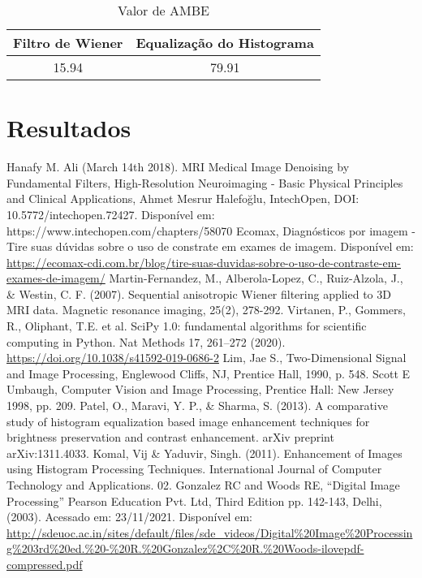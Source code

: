 \documentclass[conference]{IEEEtran}
\begin{document}
\begin{table}[H]
\renewcommand{\arraystretch}{1.3}
\caption{Valor de AMBE}
\label{table_example}
\centering
\begin{tabular}{c||c}
\hline
\bfseries Filtro de Wiener &
\bfseries Equalização do Histograma \\
\hline\hline
15.94 & 79.91 \\
\hline
\end{tabular}
\end{table}

\section{Resultados}

\begin{thebibliography}{00}
 Hanafy M. Ali (March 14th 2018). MRI Medical Image Denoising by Fundamental Filters, High-Resolution Neuroimaging - Basic Physical Principles and Clinical Applications, Ahmet Mesrur Halefoğlu, IntechOpen, DOI: 10.5772/intechopen.72427. Disponível em: https://www.intechopen.com/chapters/58070
 Ecomax, Diagnósticos por imagem - Tire suas dúvidas sobre o uso de constrate em exames de imagem. Disponível em: \url{https://ecomax-cdi.com.br/blog/tire-suas-duvidas-sobre-o-uso-de-contraste-em-exames-de-imagem/}
 Martin-Fernandez, M., Alberola-Lopez, C., Ruiz-Alzola, J., \& Westin, C. F. (2007). Sequential anisotropic Wiener filtering applied to 3D MRI data. Magnetic resonance imaging, 25(2), 278-292.
 Virtanen, P., Gommers, R., Oliphant, T.E. et al. SciPy 1.0: fundamental algorithms for scientific computing in Python. Nat Methods 17, 261–272 (2020). \url{https://doi.org/10.1038/s41592-019-0686-2}
 Lim, Jae S., Two-Dimensional Signal and Image Processing, Englewood Cliffs, NJ, Prentice Hall, 1990, p. 548.
 Scott E Umbaugh, Computer Vision and Image Processing, Prentice Hall: New Jersey 1998, pp. 209.
 Patel, O., Maravi, Y. P., \& Sharma, S. (2013). A comparative study of histogram equalization based image enhancement techniques for brightness preservation and contrast enhancement. arXiv preprint arXiv:1311.4033.
 Komal, Vij \& Yaduvir, Singh. (2011). Enhancement of Images using Histogram Processing Techniques. International Journal of Computer Technology and Applications. 02.
 Gonzalez RC and Woods RE, “Digital Image Processing” Pearson Education Pvt. Ltd, Third Edition pp. 142-143, Delhi, (2003). Acessado em: 23/11/2021. Disponível em: \url{http://sdeuoc.ac.in/sites/default/files/sde_videos/Digital%20Image%20Processing%203rd%20ed.%20-%20R.%20Gonzalez%2C%20R.%20Woods-ilovepdf-compressed.pdf}

\end{thebibliography}
\end{document}
